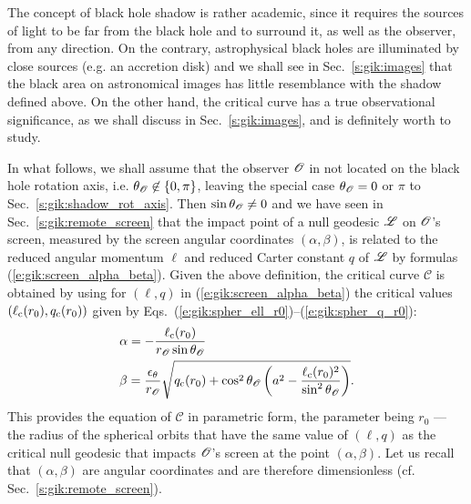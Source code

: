 \begin{remark}
The concept of black hole shadow is rather academic, since it
requires the sources of light to be far from the black hole and to surround it, as well
as the observer, from any direction. On the contrary, astrophysical black holes
are illuminated by close sources (e.g. an accretion disk) and we shall see in Sec.~\ref{s:gik:images}
that the black area on astronomical images has little resemblance with the shadow defined above.
On the other hand, the critical curve has a true observational significance, as we shall discuss
in Sec.~\ref{s:gik:images}, and is definitely worth to study.
\end{remark}

In what follows, we shall assume that the observer $\mathscr{O}$ in not located
on the black hole rotation axis, i.e. $\theta_{\mathscr{O}}\not\in\{0, \pi\}$,
leaving the special case $\theta_{\mathscr{O}} = 0$ or $\pi$ to Sec.~\ref{s:gik:shadow_rot_axis}.
Then $\sin\theta_{\mathscr{O}}\neq 0$ and we have seen in Sec.~\ref{s:gik:remote_screen} that
the impact point of a null geodesic $\mathscr{L}$ on $\mathscr{O}$'s screen, measured by
the screen angular coordinates
$(\alpha,\beta)$,
is related to the reduced angular momentum $\ell$
and reduced Carter constant $q$ of $\mathscr{L}$ by formulas
(\ref{e:gik:screen_alpha_beta}).
Given the above definition, the critical curve $\mathscr{C}$ is obtained by
using for $(\ell,q)$ in (\ref{e:gik:screen_alpha_beta})
the critical values $(\ell_{\rm c}(r_0),q_{\rm c}(r_0))$
given by Eqs.~(\ref{e:gik:spher_ell_r0})--(\ref{e:gik:spher_q_r0}):
\begin{subequations}
\label{e:gik:shadow_param_eq}
\begin{align}
& \alpha =  - \frac{\ell_{\rm c}(r_0)}{r_{\mathscr{O}}\sin\theta_{\mathscr{O}}}  \label{e:gik:shadow_param_eq_alpha}\\
& \beta =  \frac{\epsilon_\theta}{r_{\mathscr{O}}}
        \sqrt{ q_{\rm c}(r_0) + \cos^2\theta_{\mathscr{O}} \left( a^2
    - \frac{\ell_{\rm c}(r_0)^2}{\sin^2\theta_{\mathscr{O}}} \right) } . \label{e:gik:shadow_param_eq_beta}
\end{align}
\end{subequations}
This provides the equation of $\mathscr{C}$ in parametric form,
the parameter being $r_0$ --- the radius of the spherical orbits that have
the same value of $(\ell, q)$ as the critical null geodesic that impacts
$\mathscr{O}$'s screen at the point $(\alpha,\beta)$.
Let us recall that $(\alpha,\beta)$ are angular coordinates and are therefore dimensionless
(cf. Sec.~\ref{s:gik:remote_screen}).
